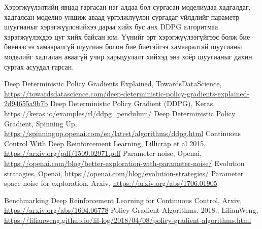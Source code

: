 \documentclass[12pt,A4]{report}
\begin{document}
Хэрэгжүүлэлтийн явцад гаргасан нэг алдаа бол сургасан моделиудаа хадгалдаг, хадгалсан моделио уншиж аваад үргэлжлүүлэн сургадаг үйлдлийг параметр шуугианыг хэрэгжүүлснийхээ дараа хийх бус анх DDPG алгоритмаа хэрэгжүүлэхдээ цуг хийх байсан юм. Үүнийг эрт хэрэгжүүлээгүйгээс болж бие биенээсээ хамааралгүй шуугиан болон бие биетэйгээ хамааралтай шуугианы моделийг хадгалан аваагүй учир харьцуулалт хийхэд энэ хоёр шуугианыг дахин сургах асуудал гарсан.


\singlespace
{}
\begin{thebibliography}{}
	Deep Deterministic Policy Gradients Explained, TowardsDataScience, \url{https://towardsdatascience.com/deep-deterministic-policy-gradients-explained-2d94655a9b7b}
	Deep Deterministic Policy Gradient (DDPG),  Keras, \url{https://keras.io/examples/rl/ddpg_pendulum/}
	Deep Deterministic Policy Gradient, Spinning Up, \url{https://spinningup.openai.com/en/latest/algorithms/ddpg.html}
	Continuous Control With Deep Reinforcement Learning, Lillicrap et al 2015, \url{https://arxiv.org/pdf/1509.02971.pdf}
	Parameter noise,  Openai, \url{https://openai.com/blog/better-exploration-with-parameter-noise/}
	Evolution stratagies,  Openai, \url{https://openai.com/blog/evolution-strategies/}
	Parameter space noise for exploration,  Arxiv, \url{https://arxiv.org/abs/1706.01905}
	
	Benchmarking Deep Reinforcement Learning for Continuous Control,  Arxiv, \url{https://arxiv.org/abs/1604.06778}
	Policy Gradient Algorithms. 2018.,  LilianWeng, \url{https://lilianweng.github.io/lil-log/2018/04/08/policy-gradient-algorithms.html}
	
\end{thebibliography}


\appendix
{}
\end{document}
